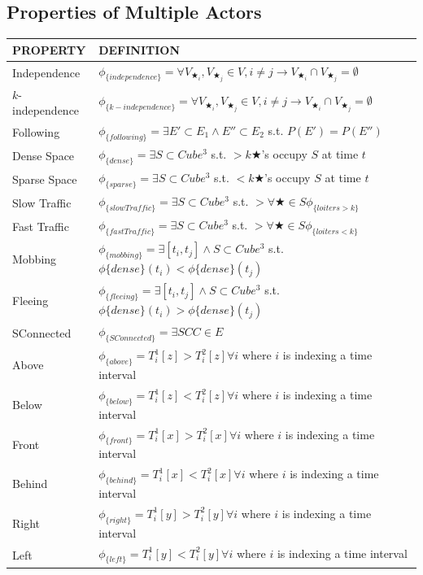 \subsection{Properties of Multiple Actors}
\begin{tabular}{| p{2.8cm} | p{11.5cm} | }
\hline
PROPERTY & DEFINITION \\ \hline
 Independence& $\phi_{\{independence\}} =  \forall V_{\bigstar_i},V_{\bigstar_j} \in V, i \neq j \rightarrow V_{\bigstar_i} \cap V_{\bigstar_j} = \emptyset $ \\ \hline
  $k$-independence& $\phi_{\{k-independence\}} =  \forall V_{\bigstar_i},V_{\bigstar_j} \in V, i \neq j \rightarrow V_{\bigstar_i} \cap V_{\bigstar_j} = \emptyset $ \\ \hline
 Following & $\phi_{\{following\}} =  \exists E' \subset E_1 \land E'' \subset E_2$ s.t. $P(E')=P(E'') $  \\ \hline
 Dense Space & $\phi_{\{dense\}} = \exists S \subset Cube^3$ s.t. $> k \bigstar$'s occupy $S$ at time $t$\\ \hline
 Sparse Space & $\phi_{\{sparse\}} = \exists S \subset Cube^3$ s.t. $< k \bigstar$'s occupy $S$ at time $t$\\ \hline
 Slow Traffic& $\phi_{\{slowTraffic\}} = \exists S \subset Cube^3$ s.t. $> \forall \bigstar \in S \phi_{\{loiters>k\}}$ \\ \hline
 Fast Traffic & $\phi_{\{fastTraffic\}} = \exists S \subset Cube^3$ s.t. $> \forall \bigstar \in S \phi_{\{loiters<k\}}$ \\ \hline
 Mobbing& $\phi_{\{mobbing\}} = \exists [t_i, t_j] \land S \subset Cube^3$ s.t. $ \phi{\{dense\}}(t_i) < \phi{\{dense\}}(t_j)$ \\ \hline
 Fleeing& $\phi_{\{fleeing\}} = \exists [t_i, t_j] \land S \subset Cube^3$ s.t. $ \phi{\{dense\}}(t_i) > \phi{\{dense\}}(t_j)$ \\ \hline
 SConnected& $\phi_{\{SConnected\}} = \exists SCC \in E$ \\ \hline
 Above & $\phi_{\{above\}} =  T^1_i[z] > T^2_i[z] \forall i$ where $i$ is indexing a time interval\\ \hline
 Below & $\phi_{\{below\}} = T^1_i[z] < T^2_i[z]  \forall i$ where $i$ is indexing a time interval\\ \hline
 Front & $\phi_{\{front\}} = T^1_i[x] > T^2_i[x]  \forall i$ where $i$ is indexing a time interval\\ \hline
 Behind & $\phi_{\{behind\}} = T^1_i[x] < T^2_i[x]  \forall i$ where $i$ is indexing a time interval\\ \hline
 Right & $\phi_{\{right\}} = T^1_i[y] > T^2_i[y]  \forall i$ where $i$ is indexing a time interval \\ \hline
 Left & $\phi_{\{left\}} = T^1_i[y] < T^2_i[y]  \forall i$ where $i$ is indexing a time interval \\ \hline
\end{tabular}

